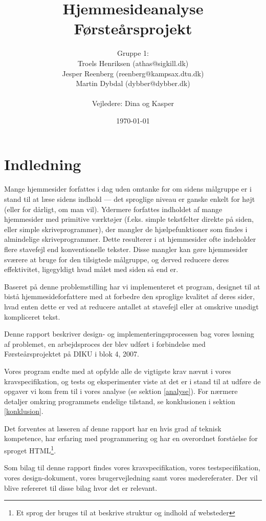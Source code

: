 \documentclass[a4paper,oneside]{memoir}
\title{Hjemmesideanalyse  \\ \small{Førsteårsprojekt}}
\author
{
  Gruppe 1:\\
  Troels Henriksen (athas@sigkill.dk)\\
  Jesper Reenberg (reenberg@kampsax.dtu.dk)\\
  Martin Dybdal (dybber@dybber.dk)\\ \\
  Vejledere: Dina og Kasper
}
\date{\today}
\begin{document}
\maketitle
\newpage
\tableofcontents*

\chapter{Indledning}
\label{indledning}
Mange hjemmesider forfattes i dag uden omtanke for om sidens målgruppe
er i stand til at læse sidens indhold --- det sproglige niveau er
ganske enkelt for højt (eller for dårligt, om man vil). Ydermere
forfattes indholdet af mange hjemmesider med primitive værktøjer
(f.eks. simple tekstfelter direkte på siden, eller simple
skriveprogrammer), der mangler de hjælpefunktioner som findes i
almindelige skriveprogrammer. Dette resulterer i at hjemmesider ofte
indeholder flere stavefejl end konventionelle tekster. Disse mangler
kan gøre hjemmesider sværere at bruge for den tilsigtede målgruppe, og
derved reducere deres effektivitet, ligegyldigt hvad målet med siden
så end er.

Baseret på denne problemstilling har vi implementeret et program,
designet til at bistå hjemmesideforfattere med at forbedre den
sproglige kvalitet af deres sider, hvad enten dette er ved at reducere
antallet at stavefejl eller at omskrive unødigt kompliceret tekst.

Denne rapport beskriver design- og implementeringsprocessen bag vores
løsning af problemet, en arbejdsproces der blev udført i forbindelse
med Førsteårsprojektet på DIKU i blok 4, 2007.

Vores program endte med at opfylde alle de vigtigste krav nævnt i
vores kravspecifikation, og tests og eksperimenter viste at det er i
stand til at udføre de opgaver vi kom frem til i vores analyse (se
sektion \ref{analyse}). For nærmere detaljer omkring programmets
endelige tilstand, se konklusionen i sektion \ref{konklusion}.

Det forventes at læseren af denne rapport har en hvis grad af teknisk
kompetence, har erfaring med programmering og har en overordnet
forståelse for sproget HTML\footnote{Et sprog der bruges til at
  beskrive struktur og indhold af websteder}.

Som bilag til denne rapport findes vores kravspecifikation, vores
testspecifikation, vores design-dokument, vores brugervejledning samt
vores mødereferater. Der vil blive refereret til disse bilag hvor det
er relevant.
\end{document}
